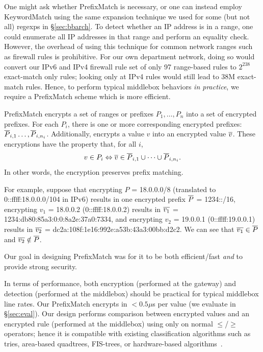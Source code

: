 One might ask whether PrefixMatch is necessary, or one can instead employ KeywordMatch using the same expansion technique we used for some (but not all) regexps in \S\ref{sec:bbarch}. 
To detect whether an IP address is in a range, one could enumerate all IP addresses in that range and perform an equality check. However, the overhead of using this technique for common network ranges such as firewall rules is prohibitive.
For our own department network, doing so would convert our IPv6 and IPv4 firewall rule set of only 97 range-based rules to $2^{238}$ exact-match only rules; looking only at IPv4 rules would still lead to 38M exact-match rules.
Hence, to perform typical middlebox behaviors {\it in practice}, we require a PrefixMatch scheme which is more efficient.




PrefixMatch encrypts a set of ranges or prefixes $P_1, \dots, P_n$ into a set of encrypted prefixes. For each $P_i$, there is one or more corresponding encrypted prefixes: $\overline{P}_{i,1} \dots, \overline{P}_{i, n_i}$.  Additionally, \pmatch{} encrypts a value $v$ into an encrypted value $\overline{v}$. These encryptions have the  property that, for all $i$,  
%
\[  v \in P_i  \Leftrightarrow \overline{v} \in \overline{P}_{i, 1} \cup \dots \cup \overline{P}_{i, n_i}. \]
%
In other words, the encryption preserves prefix matching.

For example, suppose that encrypting $P$ = 18.0.0.0/8 (translated to 0::ffff:18.0.0.0/104 in IPv6) results in one encrypted prefix $\overline{P}$ = 1234::/16, encrypting $v_1$ = 18.0.0.2 (0::ffff:18.0.0.2) results in  
 $\overline{v_1}$ = 1234:db80:85a3:0:0:8a2e:37a0:7334, and encrypting $v_2$ = 19.0.0.1 (0::ffff:19.0.0.1) results in 
$\overline{v_2}$ = dc2a:108f:1e16:992e:a53b:43a3:00bb:d2c2. We can see that $\overline{v_1} \in \overline{P}$ and $\overline{v_2} \notin \overline{P}$. 

Our goal in designing PrefixMatch was for it to be both efficient/fast {\em and} to provide strong security.





In terms of performance, both encryption (performed at the gateway) and detection (performed at the middlebox) should be practical for typical middlebox line rates.
Our PrefixMatch encrypts in $< 0.5\mu$s per value (we evaluate in \S\ref{sec:eval}).
Our design performs comparison between encrypted values and an encrypted rule (performed at the middlebox) using only on normal $\leq$/$\geq$ operators; hence it is compatible with existing classification algorithms such as tries, area-based quadtrees, FIS-trees, or hardware-based algorithms~\cite{packet_classif}.


